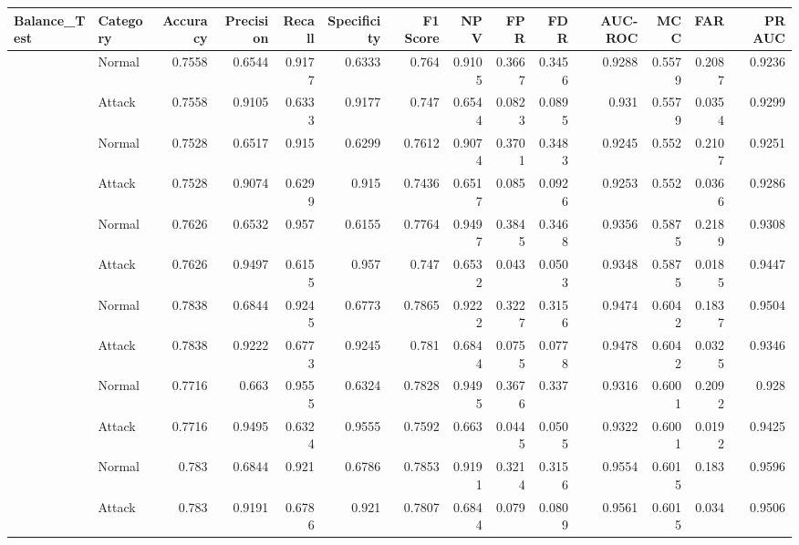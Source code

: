 \begin{tabular}{llrrrrrrrrrrrr}
\hline
 Balance_Test   & Category   &   Accuracy &   Precision &   Recall &   Specificity &   F1 Score &    NPV &    FPR &    FDR &   AUC-ROC &    MCC &    FAR &   PR AUC \\
\hline
                & Normal     &     0.7558 &      0.6544 &   0.9177 &        0.6333 &     0.764  & 0.9105 & 0.3667 & 0.3456 &    0.9288 & 0.5579 & 0.2087 &   0.9236 \\
                & Attack     &     0.7558 &      0.9105 &   0.6333 &        0.9177 &     0.747  & 0.6544 & 0.0823 & 0.0895 &    0.931  & 0.5579 & 0.0354 &   0.9299 \\
                & Normal     &     0.7528 &      0.6517 &   0.915  &        0.6299 &     0.7612 & 0.9074 & 0.3701 & 0.3483 &    0.9245 & 0.552  & 0.2107 &   0.9251 \\
                & Attack     &     0.7528 &      0.9074 &   0.6299 &        0.915  &     0.7436 & 0.6517 & 0.085  & 0.0926 &    0.9253 & 0.552  & 0.0366 &   0.9286 \\
                & Normal     &     0.7626 &      0.6532 &   0.957  &        0.6155 &     0.7764 & 0.9497 & 0.3845 & 0.3468 &    0.9356 & 0.5875 & 0.2189 &   0.9308 \\
                & Attack     &     0.7626 &      0.9497 &   0.6155 &        0.957  &     0.747  & 0.6532 & 0.043  & 0.0503 &    0.9348 & 0.5875 & 0.0185 &   0.9447 \\
                & Normal     &     0.7838 &      0.6844 &   0.9245 &        0.6773 &     0.7865 & 0.9222 & 0.3227 & 0.3156 &    0.9474 & 0.6042 & 0.1837 &   0.9504 \\
                & Attack     &     0.7838 &      0.9222 &   0.6773 &        0.9245 &     0.781  & 0.6844 & 0.0755 & 0.0778 &    0.9478 & 0.6042 & 0.0325 &   0.9346 \\
                & Normal     &     0.7716 &      0.663  &   0.9555 &        0.6324 &     0.7828 & 0.9495 & 0.3676 & 0.337  &    0.9316 & 0.6001 & 0.2092 &   0.928  \\
                & Attack     &     0.7716 &      0.9495 &   0.6324 &        0.9555 &     0.7592 & 0.663  & 0.0445 & 0.0505 &    0.9322 & 0.6001 & 0.0192 &   0.9425 \\
                & Normal     &     0.783  &      0.6844 &   0.921  &        0.6786 &     0.7853 & 0.9191 & 0.3214 & 0.3156 &    0.9554 & 0.6015 & 0.183  &   0.9596 \\
                & Attack     &     0.783  &      0.9191 &   0.6786 &        0.921  &     0.7807 & 0.6844 & 0.079  & 0.0809 &    0.9561 & 0.6015 & 0.034  &   0.9506 \\

\end{tabular}
